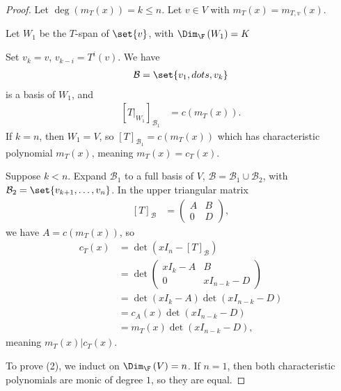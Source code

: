 \documentclass[10pt]{mypackage}
\begin{document}
\begin{proof}
  Let $\deg\left(m_{T}(x)\right) = k \leq n$. Let $v\in V$ with $m_{T}(x) = m_{T,v}(x)$.\newline

  Let $W_1$ be the $T$-span of $\set{v}$, with $\Dim_{\F}\left(W_1\right) = K$\newline

  Set $v_k = v$, $v_{k-i} = T^{i}\left(v\right)$. We have
  \begin{align*}
    \mathcal{B} = \set{v_1,dots,v_k}
  \end{align*}
  is a basis of $W_1$, and
  \begin{align*}
    \left[T\bigr\vert_{W_1}\right]_{\mathcal{B}_1} &= c\left(m_{T}(x)\right).
  \end{align*}
  If $k = n$, then $W_1 = V$, so $\left[T\right]_{\mathcal{B}_1} = c\left(m_T(x)\right)$ which has characteristic polynomial $m_T(x)$,  meaning $m_T(x) = c_T(x)$.\newline

  Suppose $k < n$. Expand $\mathcal{B}_1$ to a full basis of $V$, $\mathcal{B} = \mathcal{B}_1 \cup \mathcal{B}_2$, with $\mathcal{B}_2 = \set{v_{k+1},\dots,v_{n}}$. In the upper triangular matrix
  \begin{align*}
    \left[T\right]_{\mathcal{B}} &= \begin{pmatrix}A & B \\ 0 & D\end{pmatrix},
  \end{align*}
  we have $A = c\left(m_{T}(x)\right)$, so
  \begin{align*}
    c_{T}(x) &= \det\left(xI_n - \left[T\right]_{\mathcal{B}}\right)\\
             &= \det\begin{pmatrix}xI_k - A & B \\ 0 & xI_{n-k}-D\end{pmatrix}\\
             &= \det\left(xI_{k} - A\right)\det\left(xI_{n-k}-D\right)\\
             &= c_{A}(x)\det\left(xI_{n-k}-D\right)\\
             &= m_{T}(x)\det\left(xI_{n-k}-D\right),
  \end{align*}
  meaning $m_{T}(x)|c_T(x)$.\newline

  To prove (2), we induct on $\Dim_{\F}\left(V\right) = n$. If $n=1$, then both characteristic polynomials are monic of degree $1$, so they are equal.\newline


\end{proof}
\end{document}
